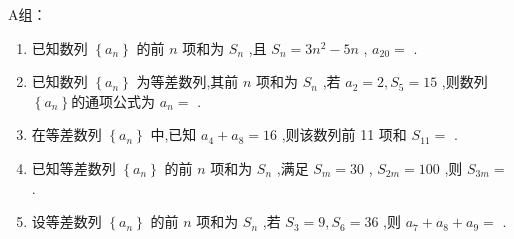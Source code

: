 A组：
\begin{enumerate}
    \item 已知数列 $\left\{  {a}_{n}\right\}$ 的前 $n$ 项和为 ${S}_{n}$ ,且 ${S}_{n} = 3{n}^{2} - {5n}$ , ${a}_{20} =$ .
    \item 已知数列 $\left\{  {a}_{n}\right\}$ 为等差数列,其前 $n$ 项和为 ${S}_{n}$ ,若 ${a}_{2} = 2,{S}_{5} = {15}$ ,则数列 $\left\{  {a}_{n}\right\}$的通项公式为 ${a}_{n} =$ .
    \item 在等差数列 $\left\{  {a}_{n}\right\}$ 中,已知 ${a}_{4} + {a}_{8} = {16}$ ,则该数列前 11 项和 ${S}_{11} =$ .
    \item 已知等差数列 $\left\{  {a}_{n}\right\}$ 的前 $n$ 项和为 ${S}_{n}$ ,满足 ${S}_{m} = {30}$ , ${S}_{2m} = {100}$ ,则 ${S}_{3m} =$ .
    \item 设等差数列 $\left\{  {a}_{n}\right\}$ 的前 $n$ 项和为 ${S}_{n}$ ,若 ${S}_{3} = 9,{S}_{6} = {36}$ ,则 ${a}_{7} + {a}_{8} + {a}_{9} =$ .
\end{enumerate}

